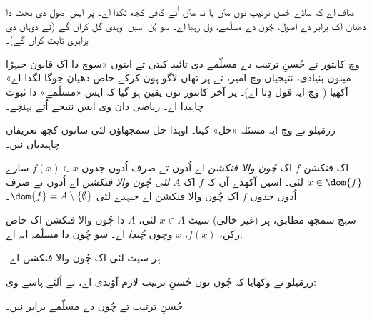 \documentclass[../../../include/open-logic-section]{subfiles}
\begin{document}

صاف اے کہ ساڈے حُسنِ ترتیب نوں منّن یا نہ منّن اُتے کافی کجھ ٹکدا اے۔ پر ایس اصول دی بحث دا دھیان اک برابر دے اصول، چُون دے مسلّمے، ول رہیا اے۔ سو ہُن اسیں اوہدی گل کراں گے (تے دوہاں دی برابری ثابت کراں گے)۔

\citeyear{Cantor1883} وچ کانتور نے حُسنِ ترتیب دے مسلّمے دی تائید کیتی تے اینوں «سوچ دا اک قانون جیہڑا مینوں بنیادی، نتیجیاں وچ امیر، تے ہر تھاں لاگو ہون کرکے خاص دھیان جوگا لگدا اے» آکھیا (\citeauthor{Potter2004} \citeyear[p.~243]{Potter2004} وچ ایہ قول دِتا اے)۔ پر آخر کانتور نوں یقین ہو گیا کہ ایس «مسلّمے» دا ثبوت چاہیدا اے۔ ریاضی دان وی ایس نتیجے اُتے پہنچے۔

زرمَیلو نے \citeyear{Zermelo1904} وچ ایہ مسئلہ «حل» کیتا۔ اوہدا حل سمجھاؤن لئی سانوں کجھ تعریفاں چاہیدیاں نیں۔

\begin{defn}
اک فنکشن $f$ اک \emph{چُون والا فنکشن} اے اُدوں تے صرف اُدوں جدوں $f(x) \in x$ سارے $x \in \dom{f}$ لئی۔ اسیں آکھدے آں کہ $f$ اک \emph{$A$ لئی چُون والا فنکشن} اے اُدوں تے صرف اُدوں جدوں $f$ اک چُون والا فنکشن اے جیہدے لئی $\dom{f} = A \setminus \{\emptyset\}$۔
\end{defn}

سہج سمجھ مطابق، ہر (غیر خالی) سیٹ $x \in A$ لئی، $A$ دا چُون والا فنکشن اک خاص رکن، $f(x)$، $x$ وچوں \emph{چُندا} اے۔ سو چُون دا مسلّمہ ایہ اے:

\begin{axiom}[چُون]
	ہر سیٹ لئی اک چُون والا فنکشن اے۔
\end{axiom}

زرمَیلو نے وکھایا کہ چُون توں حُسنِ ترتیب لازم آؤندی اے، تے اُلٹے پاسے وی:

\begin{thm}[$\ZF$ وچ]
حُسنِ ترتیب تے چُون دے مسلّمے برابر نیں۔
\end{thm}
\end{document}
